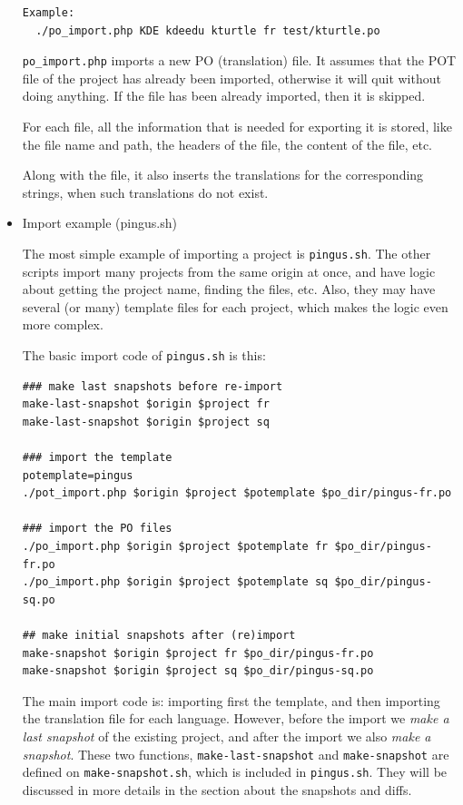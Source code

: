 \documentclass[11pt]{article}
\begin{document}
\begin{itemize}
\begin{verbatim}
Example:
  ./po_import.php KDE kdeedu kturtle fr test/kturtle.po
\end{verbatim}



     \texttt{po\_import.php} imports a new PO (translation) file.  It assumes
     that the POT file of the project has already been imported,
     otherwise it will quit without doing anything.  If the file has
     been already imported, then it is skipped.

     For each file, all the information that is needed for exporting it
     is stored, like the file name and path, the headers of the file,
     the content of the file, etc.

     Along with the file, it also inserts the translations for the
     corresponding strings, when such translations do not exist.



\item Import example (pingus.sh)\\
\label{sec-8.4.2.3}


     The most simple example of importing a project is \texttt{pingus.sh}. The
     other scripts import many projects from the same origin at once,
     and have logic about getting the project name, finding the files,
     etc. Also, they may have several (or many) template files for each
     project, which makes the logic even more complex.

     The basic import code of \texttt{pingus.sh} is this:

\begin{verbatim}
### make last snapshots before re-import
make-last-snapshot $origin $project fr
make-last-snapshot $origin $project sq

### import the template
potemplate=pingus
./pot_import.php $origin $project $potemplate $po_dir/pingus-fr.po

### import the PO files
./po_import.php $origin $project $potemplate fr $po_dir/pingus-fr.po
./po_import.php $origin $project $potemplate sq $po_dir/pingus-sq.po

## make initial snapshots after (re)import
make-snapshot $origin $project fr $po_dir/pingus-fr.po
make-snapshot $origin $project sq $po_dir/pingus-sq.po
\end{verbatim}



     The main import code is: importing first the template, and then
     importing the translation file for each language. However, before
     the import we \emph{make a last snapshot} of the existing project, and
     after the import we also \emph{make a snapshot}. These two functions,
     \texttt{make-last-snapshot} and \texttt{make-snapshot} are defined on
     \texttt{make-snapshot.sh}, which is included in \texttt{pingus.sh}. They will be
     discussed in more details in the section about the snapshots and
     diffs.




\end{itemize}
\end{document}
